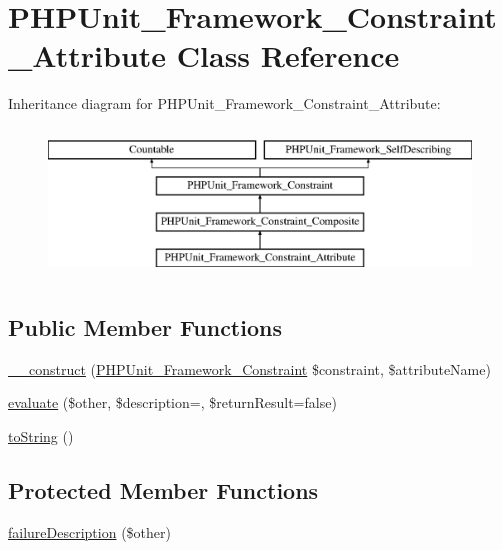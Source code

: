 \hypertarget{class_p_h_p_unit___framework___constraint___attribute}{}\section{P\+H\+P\+Unit\+\_\+\+Framework\+\_\+\+Constraint\+\_\+\+Attribute Class Reference}
\label{class_p_h_p_unit___framework___constraint___attribute}
Inheritance diagram for P\+H\+P\+Unit\+\_\+\+Framework\+\_\+\+Constraint\+\_\+\+Attribute\+:\begin{figure}[H]
\begin{center}
\leavevmode
\includegraphics[height=4.000000cm]{class_p_h_p_unit___framework___constraint___attribute}
\end{center}
\end{figure}
\subsection*{Public Member Functions}
\begin{DoxyCompactItemize}
\item 
\mbox{\hyperlink{class_p_h_p_unit___framework___constraint___attribute_a4f779220656718bedf2810f90bae8fc5}{\+\_\+\+\_\+construct}} (\mbox{\hyperlink{class_p_h_p_unit___framework___constraint}{P\+H\+P\+Unit\+\_\+\+Framework\+\_\+\+Constraint}} \$constraint, \$attribute\+Name)
\item 
\mbox{\hyperlink{class_p_h_p_unit___framework___constraint___attribute_a4c184790087f7d42c3daf0d0180fe5fb}{evaluate}} (\$other, \$description=\textquotesingle{}\textquotesingle{}, \$return\+Result=false)
\item 
\mbox{\hyperlink{class_p_h_p_unit___framework___constraint___attribute_a5558c5d549f41597377fa1ea8a1cefa3}{to\+String}} ()
\end{DoxyCompactItemize}
\subsection*{Protected Member Functions}
\begin{DoxyCompactItemize}
\item 
\mbox{\hyperlink{class_p_h_p_unit___framework___constraint___attribute_aaabb679273bfb812df4d81c283754a59}{failure\+Description}} (\$other)
\end{DoxyCompactItemize}
